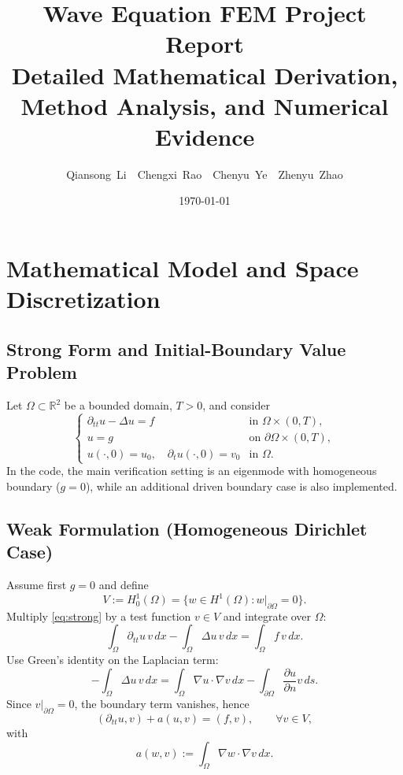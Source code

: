 \documentclass[11pt,a4paper]{report}
\title{Wave Equation FEM Project Report\\
\large Detailed Mathematical Derivation, Method Analysis, and Numerical Evidence}
\author{Qiansong\ Li\ \ Chengxi\ Rao\ \ Chenyu\ Ye\ \ Zhenyu\ Zhao}
\date{\today}
\begin{document}
\maketitle
{}
\tableofcontents
\clearpage
{}
\setcounter{page}{1}

\chapter{Mathematical Model and Space Discretization}
\section{Strong Form and Initial-Boundary Value Problem}
Let $\Omega\subset\mathbb{R}^2$ be a bounded domain, $T>0$, and consider
\begin{equation}
\begin{cases}
\partial_{tt}u - \Delta u = f & \text{in } \Omega\times(0,T),\\
u = g & \text{on } \partial\Omega\times(0,T),\\
u(\cdot,0)=u_0,\quad \partial_tu(\cdot,0)=v_0 & \text{in } \Omega.
\end{cases}
\label{eq:strong}
\end{equation}
In the code, the main verification setting is an eigenmode with homogeneous boundary ($g=0$), while an additional driven boundary case is also implemented.

\section{Weak Formulation (Homogeneous Dirichlet Case)}
Assume first $g=0$ and define
\[
V:=H_0^1(\Omega)=\{w\in H^1(\Omega):w|_{\partial\Omega}=0\}.
\]
Multiply \eqref{eq:strong} by a test function $v\in V$ and integrate over $\Omega$:
\begin{equation}
\int_\Omega \partial_{tt}u\,v\,dx - \int_\Omega \Delta u\,v\,dx = \int_\Omega f\,v\,dx.
\end{equation}
Use Green's identity on the Laplacian term:
\[
-\int_\Omega \Delta u\,v\,dx = \int_\Omega \nabla u\cdot\nabla v\,dx - \int_{\partial\Omega} \frac{\partial u}{\partial n}v\,ds.
\]
Since $v|_{\partial\Omega}=0$, the boundary term vanishes, hence
\begin{equation}
(\partial_{tt}u,v) + a(u,v) = (f,v),\qquad \forall v\in V,
\label{eq:weak}
\end{equation}
with
\[
a(w,v):=\int_\Omega \nabla w\cdot\nabla v\,dx.
\]
\end{document}
